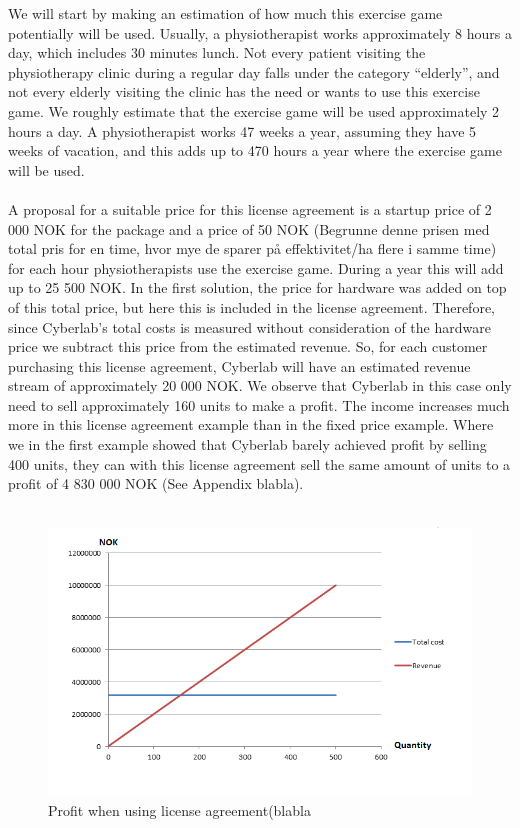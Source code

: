 We will start by making an estimation of how much this exercise game potentially will be used. Usually, a physiotherapist works approximately 8 hours a day, which includes 30 minutes lunch. Not every patient visiting the physiotherapy clinic during a regular day falls under the category “elderly”, and not every elderly visiting the clinic has the need or wants to use this exercise game. We roughly estimate that the exercise game will be used approximately 2 hours a day. A physiotherapist works 47 weeks a year, assuming they have 5 weeks of vacation, and this adds up to 470 hours a year where the exercise game will be used.\\ \\
A proposal for a suitable price for this license agreement is a startup price of 2 000 NOK for the package and a price of 50 NOK (Begrunne denne prisen med total pris for en time, hvor mye de sparer p{å} effektivitet/ha flere i samme time) for each hour physiotherapists use the exercise game. During a year this will add up to 25 500 NOK. In the first solution, the price for hardware was added on top of this total price, but here this is included in the license agreement. Therefore, since Cyberlab’s total costs is measured without consideration of the hardware price we subtract this price from the estimated revenue. So, for each customer purchasing this license agreement, Cyberlab will have an estimated revenue stream of approximately 20 000 NOK. We observe that Cyberlab in this case only need to sell approximately 160 units to make a profit. The income increases much more in this license agreement example than in the fixed price example. Where we in the first example showed that Cyberlab barely achieved profit by selling 400 units, they can with this license agreement sell the same amount of units to a profit of 4 830 000 NOK (See Appendix blabla). \\ \\	
\begin{figure}
\label{fig:RevenueStreamLicense}
\begin{center}
\includegraphics[scale=0.8]{revenuestreamlicense}
\caption[License example]{Profit when using license agreement(blabla}
\end{center}
\end{figure}
